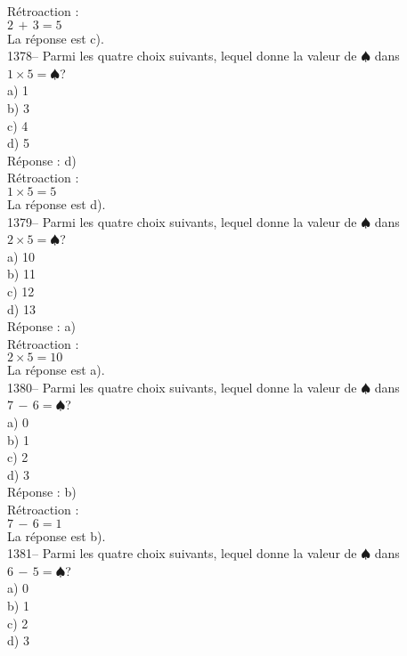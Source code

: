 ﻿\documentclass[letterpaper, 12pt]{article}
\begin{document}
R\'etroaction : \\
$2\,+\,3=5$\\
La r\'eponse est c).\\

1378-- Parmi les quatre choix suivants, lequel donne la valeur de
$\spadesuit$ dans $1\times5=\spadesuit$?\\
a) 1\\
b) 3\\
c) 4\\
d) 5\\

R\'eponse : d)\\

R\'etroaction : \\
$1\times5=5$\\
La r\'eponse est d).\\

1379-- Parmi les quatre choix suivants, lequel donne la valeur de
$\spadesuit$ dans $2\times5=\spadesuit$?\\
a) 10\\
b) 11\\
c) 12\\
d) 13\\

R\'eponse : a)\\

R\'etroaction : \\
$2\times5=10$\\
La r\'eponse est a).\\

1380-- Parmi les quatre choix suivants, lequel donne la valeur de
$\spadesuit$ dans $7\,-\,6=\spadesuit$?\\
a) 0\\
b) 1\\
c) 2\\
d) 3\\

R\'eponse : b)\\

R\'etroaction : \\
$7\,-\,6=1$\\
La r\'eponse est b).\\

1381-- Parmi les quatre choix suivants, lequel donne la valeur de
$\spadesuit$ dans $6\,-\,5=\spadesuit$?\\
a) 0\\
b) 1\\
c) 2\\
d) 3\\
\end{document}
